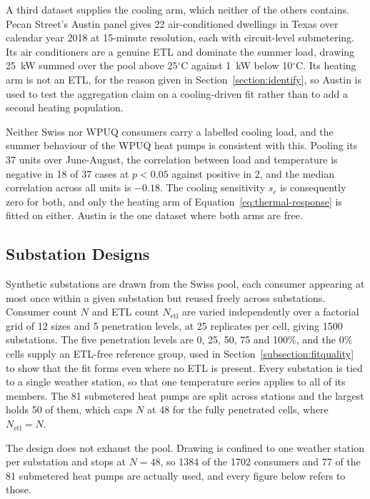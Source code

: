 \documentclass[9pt,journal,a4]{IEEEtran}
\begin{document}
A third dataset supplies the cooling arm, which neither of the others contains. Pecan Street's Austin panel gives 22 air-conditioned dwellings in Texas over calendar year 2018 at 15-minute resolution, each with circuit-level submetering. Its air conditioners are a genuine ETL and dominate the summer load, drawing 25~kW summed over the pool above 25$^\circ$C against 1~kW below 10$^\circ$C. Its heating arm is not an ETL, for the reason given in Section~\ref{section:identify}, so Austin is used to test the aggregation claim on a cooling-driven fit rather than to add a second heating population.

Neither Swiss nor WPUQ consumers carry a labelled cooling load, and the summer behaviour of the WPUQ heat pumps is consistent with this. Pooling its 37 units over June-August, the correlation between load and temperature is negative in 18 of 37 cases at $p<0.05$ against positive in 2, and the median correlation across all units is $-0.18$. The cooling sensitivity $s_c$ is consequently zero for both, and only the heating arm of Equation~\eqref{eq:thermal-response} is fitted on either. Austin is the one dataset where both arms are free.


\subsection{Substation Designs}
\label{subsection:designs}

Synthetic substations are drawn from the Swiss pool, each consumer appearing at most once within a given substation but reused freely across substations. Consumer count $N$ and ETL count $N_{\mathrm{etl}}$ are varied independently over a factorial grid of 12 sizes and 5 penetration levels, at 25 replicates per cell, giving 1500 substations. The five penetration levels are 0, 25, 50, 75 and 100\%, and the 0\% cells supply an ETL-free reference group, used in Section~\ref{subsection:fitquality} to show that the fit forms even where no ETL is present. Every substation is tied to a single weather station, so that one temperature series applies to all of its members. The 81 submetered heat pumps are split across stations and the largest holds 50 of them, which caps $N$ at 48 for the fully penetrated cells, where $N_{\mathrm{etl}} = N$.

The design does not exhaust the pool. Drawing is confined to one weather station per substation and stops at $N = 48$, so 1384 of the 1702 consumers and 77 of the 81 submetered heat pumps are actually used, and every figure below refers to those.
\end{document}
